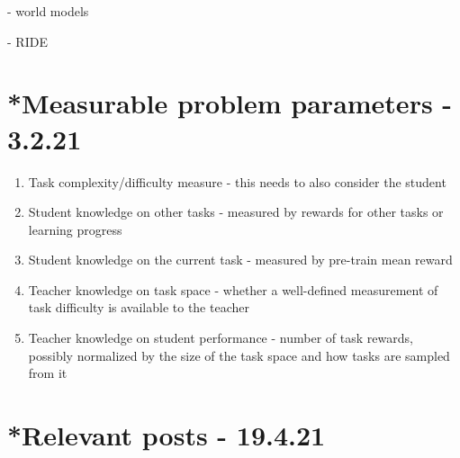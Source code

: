 \documentclass[letterpaper]{article}
\theoremstyle{definition}
\begin{document}
\cite{Ha2018} - world models

\cite{Raileanu2020} - RIDE

\section{*Measurable problem parameters - 3.2.21} \label{sec:experiments}

\begin{enumerate}
	\item Task complexity/difficulty measure - this needs to also consider the student
	\item Student knowledge on other tasks - measured by rewards for other tasks or learning progress
	\item Student knowledge on the current task - measured by pre-train mean reward
	\item Teacher knowledge on task space - whether a well-defined measurement of task difficulty is available to the teacher
	\item Teacher knowledge on student performance - number of task rewards, possibly normalized by the size of the task space and how tasks are sampled from it
\end{enumerate}

\section{*Relevant posts - 19.4.21} \label{sec:blogs}
\end{document}
